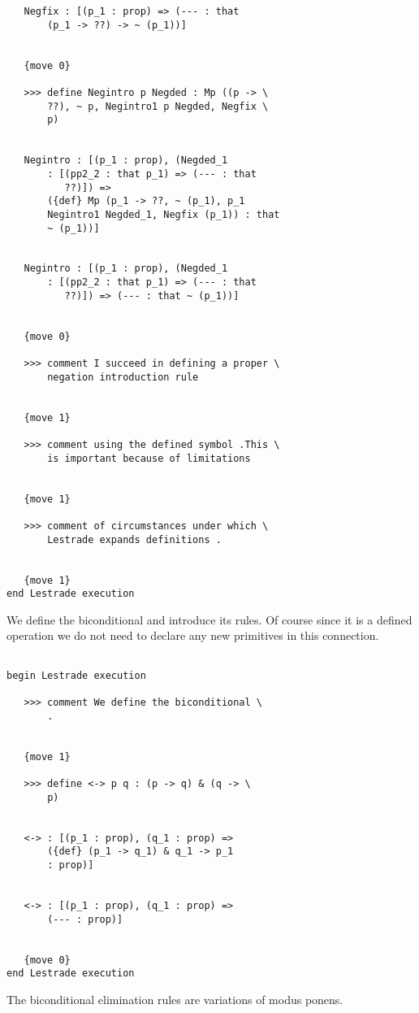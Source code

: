 \documentclass[12pt]{article}
\begin{document}
\begin{verbatim}
   Negfix : [(p_1 : prop) => (--- : that 
       (p_1 -> ??) -> ~ (p_1))]


   {move 0}

   >>> define Negintro p Negded : Mp ((p -> \
       ??), ~ p, Negintro1 p Negded, Negfix \
       p)


   Negintro : [(p_1 : prop), (Negded_1 
       : [(pp2_2 : that p_1) => (--- : that 
          ??)]) => 
       ({def} Mp (p_1 -> ??, ~ (p_1), p_1 
       Negintro1 Negded_1, Negfix (p_1)) : that 
       ~ (p_1))]


   Negintro : [(p_1 : prop), (Negded_1 
       : [(pp2_2 : that p_1) => (--- : that 
          ??)]) => (--- : that ~ (p_1))]


   {move 0}

   >>> comment I succeed in defining a proper \
       negation introduction rule


   {move 1}

   >>> comment using the defined symbol .This \
       is important because of limitations


   {move 1}

   >>> comment of circumstances under which \
       Lestrade expands definitions .


   {move 1}
end Lestrade execution
\end{verbatim}

We define the biconditional and introduce its rules.  Of course since it is a defined operation we do not need
to declare any new primitives in this connection.

\begin{verbatim}

begin Lestrade execution

   >>> comment We define the biconditional \
       .


   {move 1}

   >>> define <-> p q : (p -> q) & (q -> \
       p)


   <-> : [(p_1 : prop), (q_1 : prop) => 
       ({def} (p_1 -> q_1) & q_1 -> p_1 
       : prop)]


   <-> : [(p_1 : prop), (q_1 : prop) => 
       (--- : prop)]


   {move 0}
end Lestrade execution
\end{verbatim}

The biconditional elimination rules are variations of modus ponens.
\end{document}
